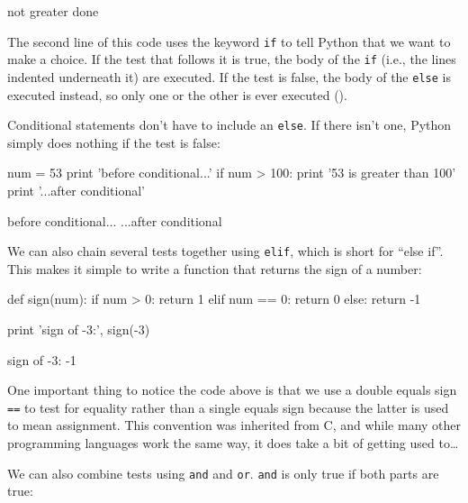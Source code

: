 \begin{VerbOut}
not greater
done
\end{VerbOut}

The second line of this code uses the keyword \texttt{if} to tell Python
that we want to make a choice. If the test that follows it is true, the
body of the \texttt{if} (i.e., the lines indented underneath it) are
executed. If the test is false, the body of the \texttt{else} is
executed instead, so only one or the other is ever executed ().


Conditional statements don't have to include an \texttt{else}. If there
isn't one, Python simply does nothing if the test is false:

\begin{VerbIn}
num = 53
print 'before conditional...'
if num > 100:
    print '53 is greater than 100'
print '...after conditional'
\end{VerbIn}

\begin{VerbOut}
before conditional...
...after conditional
\end{VerbOut}

We can also chain several tests together using \texttt{elif}, which is
short for ``else if''. This makes it simple to write a function that
returns the sign of a number:

\begin{VerbIn}
def sign(num):
    if num > 0:
        return 1
    elif num == 0:
        return 0
    else:
        return -1

print 'sign of -3:', sign(-3)
\end{VerbIn}

\begin{VerbOut}
sign of -3: -1
\end{VerbOut}

One important thing to notice the code above is that we use a double
equals sign \texttt{==} to test for equality rather than a single equals
sign because the latter is used to mean assignment. This convention was
inherited from C, and while many other programming languages work the
same way, it does take a bit of getting used to\ldots{}

We can also combine tests using \texttt{and} and \texttt{or}.
\texttt{and} is only true if both parts are true:

